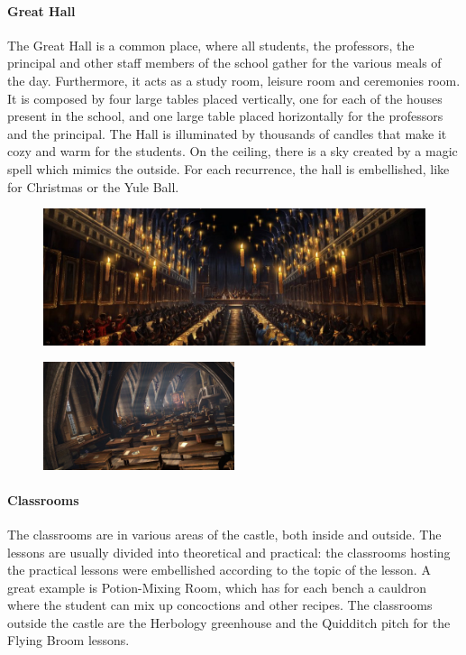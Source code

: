 \paragraph{Great Hall}
The Great Hall is a common place, where all students, the professors, the principal and other staff members of the school gather for the various meals of the day. Furthermore, it acts as a study room, leisure room and ceremonies room. It is composed by four large tables placed vertically, one for each of the houses present in the school, and one large table placed horizontally for the professors and the principal. The Hall is illuminated by thousands of candles that make it cozy and warm for the students. On the ceiling, there is a sky created by a magic spell which mimics the outside. For each recurrence, the hall is embellished, like for Christmas or the Yule Ball. 
\begin{figure}[H]
\includegraphics[max width=\textwidth]{../Pictures/Locations/Hogwarts/Great_Hall_picture.jpg} 
\end{figure}

\begin{figure}
\centering
\includegraphics[max width=0.5\textwidth]{../Pictures/Locations/Hogwarts/Classrooms_picture.jpg} 
\end{figure}
\paragraph{Classrooms}
The classrooms are in various areas of the castle, both inside and outside. The lessons are usually divided into theoretical and practical: the classrooms hosting the practical lessons were embellished according to the topic of the lesson. A great example is Potion-Mixing Room, which has for each bench a cauldron where the student can mix up concoctions and other recipes. The classrooms outside the castle are the Herbology greenhouse and the Quidditch pitch for the Flying Broom lessons. 

